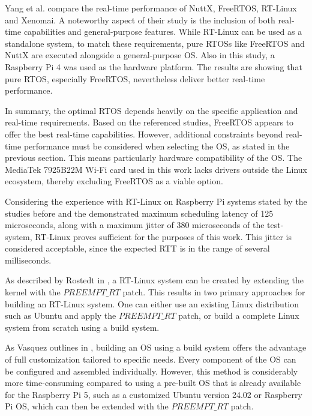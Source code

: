 Yang et al. \cite{10870260} compare the real-time performance of NuttX, FreeRTOS, RT-Linux and Xenomai. 
A noteworthy aspect of their study is the inclusion of both real-time capabilities and general-purpose features. 
While RT-Linux can be used as a standalone system, to match these requirements, pure \acp{RTOS} like FreeRTOS and NuttX are executed alongside a general-purpose \ac{OS}. 
Also in this study, a Raspberry Pi 4 was used as the hardware platform. 
The results are showing that pure \ac{RTOS}, especially FreeRTOS, nevertheless deliver better real-time performance.

In summary, the optimal \ac{RTOS} depends heavily on the specific application and real-time requirements. 
Based on the referenced studies, FreeRTOS appears to offer the best real-time capabilities. 
However, additional constraints beyond real-time performance must be considered when selecting the \ac{OS}, as stated in the previous section.
This means particularly hardware compatibility of the \ac{OS}. 
The MediaTek 7925B22M Wi-Fi card used in this work lacks drivers outside the Linux ecosystem, thereby excluding FreeRTOS as a viable option.

Considering the experience with RT-Linux on Raspberry Pi systems stated by the studies before and the demonstrated maximum scheduling latency of 125 microseconds, along with a maximum jitter of 380 microseconds of the test-system, RT-Linux proves sufficient for the purposes of this work. 
This jitter is considered acceptable, since the expected \ac{RTT} is in the range of several milliseconds. 

As described by Rostedt in \cite{rt_patch}, a  RT-Linux system can be created by extending the kernel with the $PREEMPT\_RT$ patch. 
This results in two primary approaches for building an RT-Linux system. 
One can either use an existing Linux distribution such as Ubuntu and apply the $PREEMPT\_RT$ patch, or build a complete Linux system from scratch using a build system.

As Vasquez outlines in \cite[Chap. 6]{10163343}, building an \ac{OS} using a build system offers the advantage of full customization tailored to specific needs. 
Every component of the \ac{OS} can be configured and assembled individually. 
However, this method is considerably more time-consuming compared to using a pre-built \ac{OS} that is already available for the Raspberry Pi 5, such as a customized Ubuntu version 24.02 or Raspberry Pi OS, which can then be extended with the $PREEMPT\_RT$ patch.

